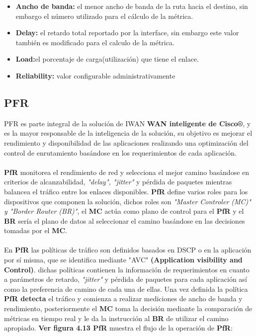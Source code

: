 \begin{itemize}
\item\textbf{Ancho de banda:} el menor ancho de banda de la ruta hacia el destino, sin embargo el número utilizado para el cálculo de la métrica.
\item\textbf{Delay:} el retardo total reportado por la interface, sin embargo este valor también es modificado para el calculo de la métrica.
\item\textbf{Load:}el porcentaje de carga(utilización) que tiene el enlace.
\item\textbf{Reliability:} valor configurable administrativamente
\end{itemize}


\subsection{PFR}
\label{sec:PFR}

PFR es parte integral de la solución de IWAN \textbf{WAN inteligente de Cisco®}, y es la mayor responsable de la inteligencia de la solución, su objetivo es mejorar el rendimiento y disponibilidad de las aplicaciones realizando una optimización del control de enrutamiento basándose en los requerimientos de cada aplicación. 
\\
\\
\textbf{PfR} monitorea el rendimiento de red y selecciona el mejor camino basándose en criterios de alcanzabilidad, \textit{"delay", "jitter"} y pérdida de paquetes mientras balancea el tráfico entre los enlaces disponibles.
\textbf{PfR} define varios roles para los dispositivos que componen la solución, dichos roles son \textit{"Master Controler (MC)" y "Border Router (BR)"}, el \textbf{MC} actúa como plano de control para el \textbf{PfR} y el \textbf{BR} sería el plano de datos al seleccionar el camino basándose en las decisiones tomadas por el \textbf{MC}.
\\
\\
En \textbf{PfR} las políticas de tráfico son definidos basados en DSCP o en la aplicación por sí misma, que se identifica mediante "AVC" \textbf{(Application visibility and Control)}. dichas políticas contienen la información de requerimientos en cuanto a parámetros de retardo, \textit{"jitter"} y pérdida de paquetes para cada aplicación así como la preferencia de camino de cada una de ellas. Una vez definida la política \textbf{PfR detecta} el tráfico y comienza a realizar mediciones de ancho de banda y rendimiento, posteriormente el \textbf{MC} toma la decisión mediante la comparación de métricas en tiempo real y le da la instrucción al \textbf{BR} de utilizar el camino apropiado. \textbf{Ver figura 4.13 PfR} muestra el flujo de la operación de \textbf{PfR}:

